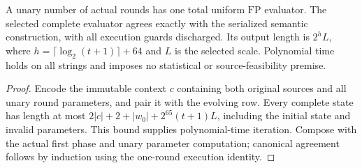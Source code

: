 \begin{theorem}
  \label{thm:lowerbounds-algebraic-affine-construction-program}
  \leanok
  A unary number of actual rounds has one total uniform $\mathrm{FP}$
  evaluator. The selected complete evaluator agrees exactly with the
  serialized semantic construction, with all execution guards discharged.
  Its output length is $2^hL$, where $h=\lceil\log_2(t+1)\rceil+64$ and
  $L$ is the selected scale. Polynomial time holds on all strings and
  imposes no statistical or source-feasibility premise.
\end{theorem}
\begin{proof}
  \leanok
  Encode the immutable context $c$ containing both original sources and
  all unary round parameters, and pair it with the evolving row. Every
  complete state has length at most
  $2|c|+2+|w_0|+2^{65}(t+1)L$, including the initial state and invalid
  parameters. This bound supplies polynomial-time iteration. Compose
  with the actual first phase and unary parameter computation; canonical
  agreement follows by induction using the one-round execution identity.
\end{proof}

